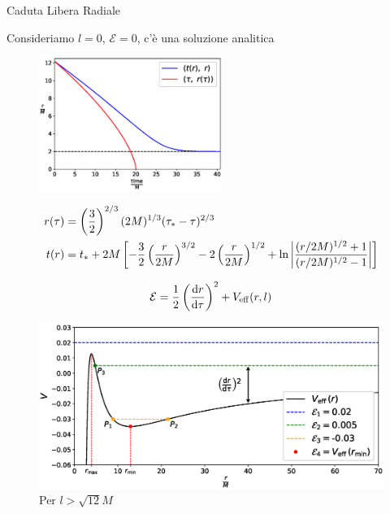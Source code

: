 \begin{frame}{Caduta Libera Radiale}

    Consideriamo $l = 0$, $\mathcal E = 0$, c'è una soluzione analitica

    \begin{figure}
        \includegraphics[width=0.53\textwidth]{Figures/ch1/radial_infall.eps}
    \end{figure}

    \begin{align*}
        r(\tau) &= \left(\frac{3}{2}\right)^{2/3}
        (2M)^{1/3} (\tau_* - \tau)^{2/3} \\
        t (r) &= t_* + 2M \left[ -\frac{3}{2} \left(\frac{r}{2M}\right)^{3/2}
        - 2 \left(\frac{r}{2M}\right)^{1/2}
        + \ln \abs{\frac{(r/2M)^{1/2} + 1}{(r/2M)^{1/2} - 1}} \right]
    \end{align*}

\end{frame}


\begin{frame}{}

    \begin{equation*}
        \mathcal E = \frac{1}{2} \left( \dv{r}{\tau} \right)^2 + V_{\rm eff}(r, l)
    \end{equation*}

    \begin{figure}
        \centering
        \includegraphics[width=\textwidth]{Figures/ch1/V_eff_orbits.eps}
        \caption{Per $l > \sqrt{12} M$}
    \end{figure}

\end{frame}


